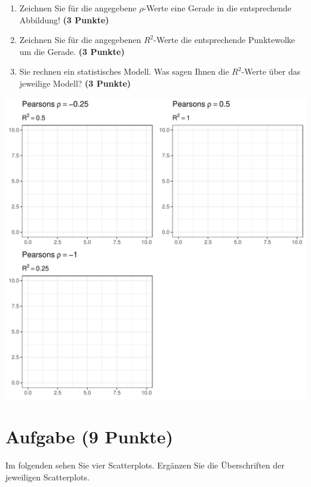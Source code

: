\documentclass[a4paper, 10pt]{scrartcl}\usepackage[]{graphicx}\usepackage[]{xcolor}
\makeatletter
\def\maxwidth{ %
  \ifdim\Gin@nat@width>\linewidth
    \linewidth
  \else
    \Gin@nat@width
  \fi
}
\makeatother
\begin{document}
\begin{enumerate}
\item Zeichnen Sie f{\"u}r die angegebene $\rho$-Werte eine Gerade in die
  entsprechende Abbildung! \textbf{(3 Punkte)}
\item Zeichnen Sie f{\"u}r die angegebenen $R^2$-Werte die entsprechende
  Punktewolke um die Gerade. \textbf{(3 Punkte)}
\item Sie rechnen ein statistisches Modell. Was sagen Ihnen die $R^2$-Werte
  {\"u}ber das jeweilige Modell? \textbf{(3 Punkte)}
\end{enumerate}




{\centering \includegraphics[width=\maxwidth]{img/correlation-01-1} 

}



 
\clearpage

\section{Aufgabe \hfill (9 Punkte)}

Im folgenden sehen Sie vier Scatterplots. Erg{\"a}nzen Sie die {\"U}berschriften
der jeweiligen Scatterplots.
\end{document}
